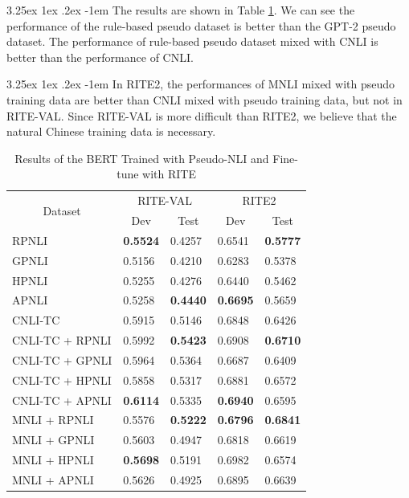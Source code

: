 \documentclass[12pt]{article}
\makeatletter
\renewcommand\paragraph{\@startsection{paragraph}{5}{\z@}%
  {3.25ex \@plus1ex \@minus.2ex}%
  {-1em}%
  {\normalfont\normalsize\bfseries}}
\makeatother
\begin{document}
\begin{CJK*}{UTF8}{bkai}
\begin{spacing}{1.77}
\paragraph{}
The results are shown in Table \ref{result:pseudo_nli_bert}. We can see the performance of the rule-based pseudo dataset is better than the GPT-2 pseudo dataset. The performance of rule-based pseudo dataset mixed with CNLI is better than the performance of CNLI.

\paragraph{}
In RITE2, the performances of MNLI mixed with pseudo training data are better than CNLI mixed with pseudo training data, but not in RITE-VAL. Since RITE-VAL is more difficult than RITE2, we believe that the natural Chinese training data is necessary.

\begin{table}[H]
  \centering
  \setlength{\extrarowheight}{-3pt}
  \caption{Results of the BERT Trained with Pseudo-NLI and Fine-tune with RITE}
  \label{result:pseudo_nli_bert}
  \begin{tabular}{|l|l|l|l|l|}
  \hline
  \multicolumn{1}{|c|}{\multirow{2}{*}{Dataset}} & \multicolumn{2}{c|}{RITE-VAL} & \multicolumn{2}{c|}{RITE2} \\ \cline{2-5}
  \multicolumn{1}{|c|}{} & \multicolumn{1}{c|}{Dev} & \multicolumn{1}{c|}{Test} & \multicolumn{1}{c|}{Dev} & \multicolumn{1}{c|}{Test} \\ \hline
  RPNLI & \textbf{0.5524} & 0.4257 & 0.6541 & \textbf{0.5777} \\ \hline
  GPNLI & 0.5156 & 0.4210 & 0.6283 & 0.5378 \\ \hline
  HPNLI & 0.5255 & 0.4276 & 0.6440 & 0.5462 \\ \hline
  APNLI & 0.5258 & \textbf{0.4440} & \textbf{0.6695} & 0.5659 \\
  \hline \hline
  CNLI-TC & 0.5915 & 0.5146 & 0.6848 & 0.6426 \\ \hline
  CNLI-TC + RPNLI & 0.5992 & \textbf{0.5423} & 0.6908 & \textbf{0.6710} \\ \hline
  CNLI-TC + GPNLI & 0.5964 & 0.5364 & 0.6687 & 0.6409 \\ \hline
  CNLI-TC + HPNLI & 0.5858 & 0.5317 & 0.6881 & 0.6572 \\ \hline
  CNLI-TC + APNLI & \textbf{0.6114} & 0.5335 & \textbf{0.6940} & 0.6595 \\
  \hline \hline
  MNLI + RPNLI & 0.5576 & \textbf{0.5222} & \textbf{0.6796} & \textbf{0.6841} \\ \hline
  MNLI + GPNLI & 0.5603 & 0.4947 & 0.6818 & 0.6619 \\ \hline
  MNLI + HPNLI & \textbf{0.5698} & 0.5191 & 0.6982 & 0.6574 \\ \hline
  MNLI + APNLI & 0.5626 & 0.4925 & 0.6895 & 0.6639 \\ \hline
  \end{tabular}
\end{table}


\end{spacing}
\end{CJK*}
\end{document}
